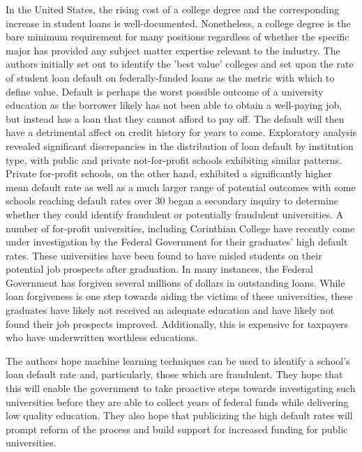 \documentclass[10pt,twocolumn]{article}
\begin{document}
In the United States, the rising cost of a college degree and the corresponding
increase in student loans is well-documented. Nonetheless, a college degree is the bare
minimum requirement for many positions regardless of whether the specific major
has provided any subject matter expertise relevant to the industry. The authors
initially set out to identify the 'best value' colleges and set upon the rate of
student loan default on federally-funded loans as the metric with which to define
value. Default is perhaps the worst possible outcome of a university education
as the borrower likely has not been able to obtain a well-paying job, but instead
has a loan that they cannot afford to pay off. The default will then have a
detrimental affect on credit history for years to come. Exploratory analysis
revealed significant discrepancies in the distribution of loan default by
institution type, with public and private not-for-profit schools exhibiting similar
patterns. Private for-profit schools, on the other hand, exhibited a significantly
higher mean default rate as well as a much larger range of potential outcomes with
some schools reaching default rates over 30%
began a secondary inquiry to determine whether they could identify fraudulent or
potentially fraudulent universities. A number of for-profit universities, including
Corinthian College have recently come under investigation by the Federal Government
for their graduates' high default rates. These universities have been found to have
misled students on their potential job prospects after graduation. In many instances,
the Federal Government has forgiven several millions of dollars in outstanding loans.
While loan forgiveness is one step towards aiding the victims of these universities,
these graduates have likely not received an adequate education and have likely not
found their job prospects improved. Additionally, this is expensive for taxpayers
who have underwritten worthless educations.

The authors hope machine learning techniques can be used to identify a school's
loan default rate and, particularly, those which are fraudulent. They hope that this
will enable the government to take proactive steps towards investigating such universities
before they are able to collect years of federal funds while delivering low quality
education. They also hope that publicizing the high default rates will prompt
reform of the process and build support for increased funding for public universities.
\end{document}

